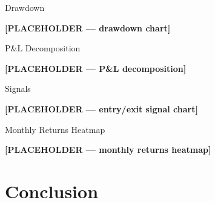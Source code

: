 \documentclass{beamer}
\begin{document}
\begin{frame}{Drawdown}
  \begin{center}
    \vspace{2cm}
    \textbf{[PLACEHOLDER --- drawdown chart]}
    \vspace{2cm}
  \end{center}
\end{frame}

\begin{frame}{P\&L Decomposition}
  \begin{center}
    \vspace{2cm}
    \textbf{[PLACEHOLDER --- P\&L decomposition]}
    \vspace{2cm}
  \end{center}
\end{frame}

\begin{frame}{Signals}
  \begin{center}
    \vspace{2cm}
    \textbf{[PLACEHOLDER --- entry/exit signal chart]}
    \vspace{2cm}
  \end{center}
\end{frame}

\begin{frame}{Monthly Returns Heatmap}
  \begin{center}
    \vspace{2cm}
    \textbf{[PLACEHOLDER --- monthly returns heatmap]}
    \vspace{2cm}
  \end{center}
\end{frame}

\section{Conclusion}
\end{document}
